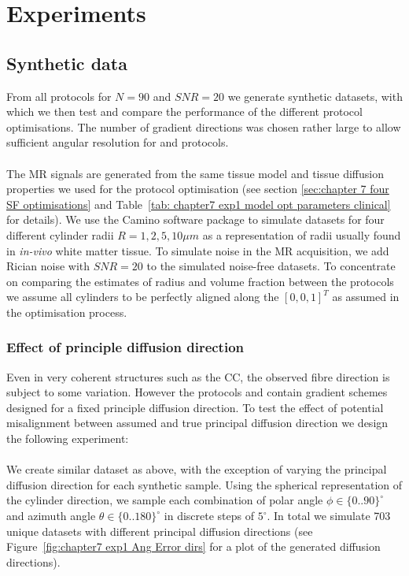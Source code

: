 \section{Experiments}
\subsection{Synthetic data}
From all protocols for $N=90$ and $SNR=20$ we generate synthetic datasets, with which we then test and compare the performance of the different protocol optimisations. The number of gradient directions was chosen rather large to allow sufficient angular resolution for {\OI} and {\DO} protocols.
\paragraph{}
\label{sec: chapter 6 fibre distribution perfect}
The MR signals are generated from the same tissue model and tissue diffusion properties we used for the protocol optimisation (see section \ref{sec:chapter 7 four SF optimisations} and Table~\ref{tab: chapter7 exp1 model opt parameters clinical} for details). We use the Camino software package \citep{Cook:2006} to simulate datasets for four different cylinder radii $R={1,2,5,10}\mu m$ as a representation of radii usually found in \emph{in-vivo} white matter tissue. To simulate noise in the MR acquisition, we add Rician noise with $SNR=20$ to the simulated noise-free datasets. To concentrate on comparing the estimates of radius and volume fraction between the protocols we assume all cylinders to be perfectly aligned along the $[0,0,1]^T$ as assumed in the optimisation process.

\subsubsection*{Effect of principle diffusion direction}
Even in very coherent structures such as the \gls{CC}, the observed fibre direction is subject to some variation. However the protocols {\FD} and {\DO} contain gradient schemes designed for a fixed principle diffusion direction. To test the effect of potential misalignment between assumed and true principal diffusion direction we design the following experiment:
\paragraph{}
We create similar dataset as above, with the exception of varying the principal diffusion direction for each synthetic sample. Using the spherical representation of the cylinder direction, we sample each combination of polar angle $\phi \in \{0..90\}^\circ$ and azimuth angle $\theta \in \{0..180\}^\circ$ in discrete steps of $5^\circ$. In total we simulate 703 unique datasets with different principal diffusion directions (see Figure~\ref{fig:chapter7 exp1 Ang Error dirs} for a plot of the generated diffusion directions).

